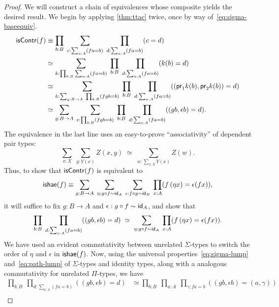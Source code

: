 \begin{proof}
  We will construct a chain of equivalences whose composite yields the desired result.
  We begin by applying \autoref{thm:ttac} twice, once by way of~\eqref{eq:sigma-baseequiv}.
  \begin{align*}
    \iscontr(f)
    &\jdeq \prod_{b:B} \; \sum_{c:\sum_{a:A}(fa=b)}\; \prod_{d:\sum_{a:A}(fa=b)} (c=d)\\
    &\simeq \sum_{k:\prod_{b:B}\sum_{a:A} (fa=b)} \;\prod_{b:B} \;\prod_{d:\sum_{a:A}(fa=b)} (k(b)=d)\\
    &\simeq \sum_{k:\sum_{g:B\to A}\;\prod_{b:B} (fgb=b)} \;\prod_{b:B} \;\prod_{d:\sum_{a:A}(fa=b)} ((\proj1 k(b),\proj2 k(b))=d)\\
    &\simeq \sum_{g:B\to A} \; \sum_{\epsilon:\prod_{b:B} (fgb=b)} \;\prod_{b:B} \;\prod_{d:\sum_{a:A}(fa=b)} ((gb,\epsilon b)=d).
  \end{align*}
  The equivalence in the last line uses an easy-to-prove ``associativity'' of dependent pair types:
  \[\sum_{x:X} \; \sum_{y:Y(x)} Z(x,y) \;\simeq\; \sum_{w:\sum_{x:X} Y(x)} Z(w).\]
  Thus, to show that $\iscontr(f)$ is equivalent to
  \begin{equation*}
    \ishae(f) \jdeq \sum_{g:B\to A} \;\sum_{\eta: g \circ f \htpy \idfunc[A]} \; \sum_{\epsilon:f \circ g \htpy \idfunc[B]} \;
    \prod_{x:A} (\map{f}{\eta x} = \epsilon(fx)),
  \end{equation*}
  it will suffice to fix $g:B\to A$ and $\epsilon:g\circ f \htpy \idfunc[A]$, and show that
  \begin{equation}\label{eq:ech-part2}
    \prod_{b:B} \;\prod_{d:\sum_{a:A}(fa=b)} ((gb,\epsilon b)=d)
    \;\simeq \;
    \sum_{\eta: g \circ f \htpy \idfunc[A]} \;
    \prod_{x:A} (\map{f}{\eta x} = \epsilon(fx)).
  \end{equation}
  We have used an evident commutativity between unrelated $\Sigma$-types to switch the order of $\eta$ and $\epsilon$ in $\ishae(f)$.
  Now, using the universal properties~\eqref{eq:sigma-lump} and~\eqref{eq:path-lump} of $\Sigma$-types and identity types, along with a analogous commutativity for unrelated $\Pi$-types, we have
  \begin{align*}
    \prod_{b:B} \;\prod_{d:\sum_{a:A}(fa=b)} ((gb,\epsilon b)=d)
    &\simeq \prod_{b:B} \;\prod_{a:A} \;\prod_{\gamma:fa=b} ((gb,\epsilon b)= (a,\gamma))\\

\end{align*}
\end{proof}
